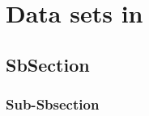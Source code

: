 \newpage
\section{Data sets in \pp}
\label{sec:Section02}

\subsection{SbSection}
\label{sec:Section0x.a-}

\subsubsection{Sub-Sbsection}